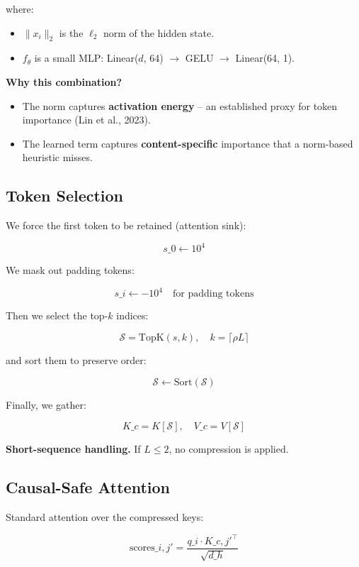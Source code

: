 where:

\begin{itemize}
\item $\|x_i\|_2$ is the $\ell_2$ norm of the hidden state.
\item $f_\theta$ is a small MLP: Linear($d$, 64) $\to$ GELU $\to$ Linear(64, 1).

\end{itemize}
\textbf{Why this combination?}

\begin{itemize}
\item The norm captures \textbf{activation energy} -- an established proxy for token
  importance (Lin et al., 2023).
\item The learned term captures \textbf{content-specific} importance that a
  norm-based heuristic misses.

\end{itemize}
\subsection{Token Selection}

We force the first token to be retained (attention sink):

\[
s\_0 \leftarrow 10^4
\tag{4.2}
\]

We mask out padding tokens:

\[
s\_i \leftarrow -10^4 \quad \text{for padding tokens}
\tag{4.3}
\]

Then we select the top-$k$ indices:

\[
\mathcal{S} = \text{TopK}(s, k), \quad k = \lceil \rho L \rceil
\tag{4.4}
\]

and sort them to preserve order:

\[
\mathcal{S} \leftarrow \text{Sort}(\mathcal{S})
\tag{4.5}
\]

Finally, we gather:

\[
K\_c = K[\mathcal{S}], \quad V\_c = V[\mathcal{S}]
\tag{4.6}
\]

\textbf{Short-sequence handling.} If $L \leq 2$, no compression is applied.

\subsection{Causal-Safe Attention}

Standard attention over the compressed keys:

\[
\text{scores}\_{i, j'} = \frac{q\_i \cdot K\_{c, j'}^\top}{\sqrt{d\_h}}
\tag{4.7}
\]

